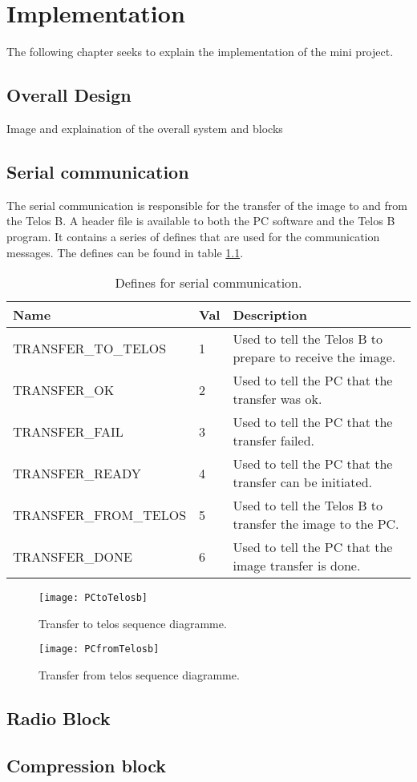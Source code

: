 \chapter{Implementation}
The following chapter seeks to explain the implementation of the mini project.\\

\section{Overall Design}
Image and explaination of the overall system and blocks\\

\section{Serial communication}
The serial communication is responsible for the transfer of the image to and from the Telos B. A header file is available to both the PC software and the Telos B program. It contains a series of defines that are used for the communication messages. The defines can be found in table \ref{definetable}.
\begin{table}[H]
    \begin{tabular}{|l|l|l|}
    \hline
    Name                  & Val & Description                                               \\ \hline
    TRANSFER\_TO\_TELOS   & 1     & Used to tell the Telos B to prepare to receive the image. \\ \hline
    TRANSFER\_OK          & 2     & Used to tell the PC that the transfer was ok.             \\ \hline
    TRANSFER\_FAIL        & 3     & Used to tell the PC that the transfer failed.             \\ \hline
    TRANSFER\_READY       & 4     & Used to tell the PC that the transfer can be initiated.   \\ \hline
    TRANSFER\_FROM\_TELOS & 5     & Used to tell the Telos B to transfer the image to the PC.  \\ \hline
    TRANSFER\_DONE        & 6     & Used to tell the PC that the image transfer is done.      \\ \hline
    \end{tabular}
    \caption{Defines for serial communication.}
    \label{definetable}
\end{table}
\begin{figure}[H]
	\centering
	\texttt{[image: PCtoTelosb]}
	\caption{Transfer to telos sequence diagramme.}
	\label{transfertotelos}
\end{figure}

\begin{figure}[H]
	\centering
	\texttt{[image: PCfromTelosb]}
	\caption{Transfer from telos sequence diagramme.}
	\label{transferfromtelos}
\end{figure}

\section{Radio Block}

\section{Compression block}


